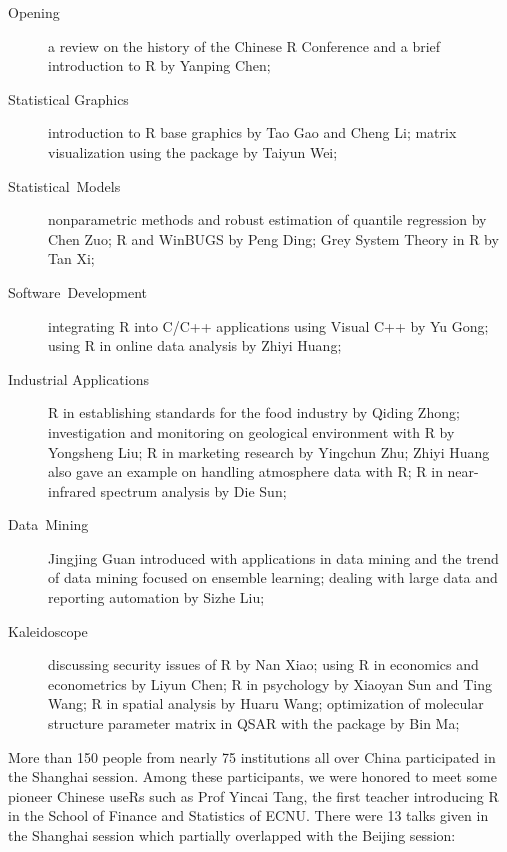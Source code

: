 \begin{description}
\item [{Opening}] a review on the history of the Chinese R Conference and
a brief introduction to R by Yanping Chen;
\item [{Statistical Graphics}] introduction to R base graphics by Tao Gao and Cheng
Li; matrix visualization using the package  by Taiyun
Wei;
\item [{Statistical\ Models}] nonparametric methods and robust estimation
of quantile regression by Chen Zuo; R and WinBUGS by Peng Ding; Grey
System Theory in R by Tan Xi;
\item [{Software\ Development}] integrating R into C/C++
applications using Visual C++ by Yu Gong; using R in online data
analysis by Zhiyi Huang;
\item [{Industrial Applications}] R in establishing standards for the food industry
by Qiding Zhong; investigation and monitoring on geological
environment with R by Yongsheng Liu; R in marketing research by
Yingchun Zhu; Zhiyi Huang also gave an example on handling
atmosphere data with R; R in near-infrared spectrum analysis by Die
Sun;
\item [{Data\ Mining}] Jingjing Guan introduced 
with applications in data mining and the trend of data mining
focused on ensemble learning; dealing with large data and reporting
automation by Sizhe Liu;
\item [{Kaleidoscope}] discussing security issues of R by Nan Xiao; using R in economics and econometrics
by Liyun Chen; R in psychology by Xiaoyan Sun and Ting Wang; R in
spatial analysis by Huaru Wang; optimization of molecular structure
parameter matrix in QSAR with the package  by Bin Ma;
\end{description}

More than 150 people from nearly 75 institutions all over China
participated in the Shanghai session. Among these participants, we
were honored to meet some pioneer Chinese useRs such as Prof Yincai
Tang, the first teacher introducing R in the School of Finance and
Statistics of ECNU. There were 13 talks given in the Shanghai
session which partially overlapped with the Beijing session:

